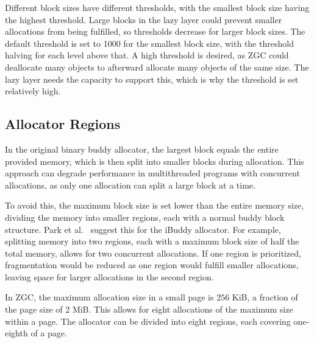 Different block sizes have different thresholds, with the smallest block size having the highest threshold. Large blocks in the lazy layer could prevent smaller allocations from being fulfilled, so thresholds decrease for larger block sizes. The default threshold is set to 1000 for the smallest block size, with the threshold halving for each level above that. A high threshold is desired, as ZGC could deallocate many objects to afterward allocate many objects of the same size. The lazy layer needs the capacity to support this, which is why the threshold is set relatively high.


\newpage
\subsection{Allocator Regions} \label{sec:concurrencyexpl}
In the original binary buddy allocator, the largest block equals the entire provided memory, which is then split into smaller blocks during allocation. This approach can degrade performance in multithreaded programs with concurrent allocations, as only one allocation can split a large block at a time.

To avoid this, the maximum block size is set lower than the entire memory size, dividing the memory into smaller regions, each with a normal buddy block structure. Park et al.~\cite{park2014ibuddy} suggest this for the iBuddy allocator. For example, splitting memory into two regions, each with a maximum block size of half the total memory, allows for two concurrent allocations. If one region is prioritized, fragmentation would be reduced as one region would fulfill smaller allocations, leaving space for larger allocations in the second region.

In ZGC, the maximum allocation size in a small page is $256$ KiB, a fraction of the page size of 2 MiB. This allows for eight allocations of the maximum size within a page. The allocator can be divided into eight regions, each covering one-eighth of a page.


